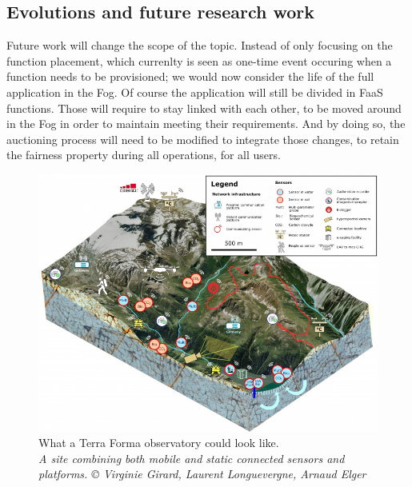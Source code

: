 \subsection{Evolutions and future research work}


Future work will change the scope of the topic. Instead of only focusing on the function placement, which currenlty is seen as one-time event occuring when a function needs to be provisioned; we would now consider the life of the full application in the Fog. Of course the application will still be divided in \gls{FaaS} functions. Those will require to stay linked with each other, to be moved around in the Fog in order to maintain meeting their requirements. And by doing so, the auctioning process will need to be modified to integrate those changes, to retain the fairness property during all operations, for all users.

\begin{figure}[H]
	\centering
	\includegraphics[width=1\textwidth]{./assets/terraforma.jpg}
	\caption[What a Terra Forma observatory could look like]{What a Terra Forma observatory could look like.\\
		\textit{A site combining both mobile and static connected sensors and platforms. © Virginie Girard, Laurent Longuevergne, Arnaud Elger}}
	\label{fig:terraforma}
\end{figure}

